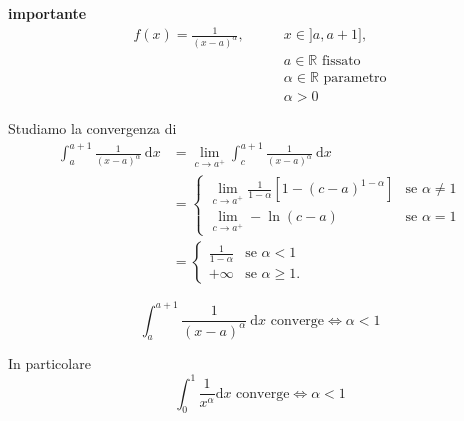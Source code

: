 \begin{exbar}
\begin{example} \textbf{importante}
	\begin{align*}
		f(x)=\frac{1}{(x-a)^\alpha}, \qquad
		& x \in ]a, a+1], 
		\\ & a \in \mathbb{R} \text{ fissato}
		\\ & \alpha \in \mathbb{R} \text{ parametro}
		\\ & \alpha > 0
	\end{align*}
	
	Studiamo la convergenza di 
	\begin{align*}
		\int_{a}^{a+1} \frac{1}{(x-a)^\alpha} \ \mathrm{d}x  
		&= \lim_{c \rightarrow a^+} \int_{c}^{a+1} \frac{1}{(x-a)^\alpha} \ \mathrm{d}x
		\\
		&=
		\begin{cases}
			\lim_{c \rightarrow a^+} \frac{1}{1-\alpha} \left[1 - (c-a)^{1-\alpha} \right] & \text{se } \alpha \neq 1 
			\\[1em]
			\lim_{c \rightarrow a^+} -\ln(c-a) & \text{se } \alpha =1
		\end{cases}\\
		&=
		\begin{cases}
			\frac{1}{1-\alpha} & \text{se } \alpha <1 
			\\[1em]
			+\infty & \text{se } \alpha \geq1.
		\end{cases}
	\end{align*}
\end{example}
\end{exbar}

\begin{attbar}
	\begin{equation*}
		\int_{a}^{a+1} \frac{1}{(x-a)^\alpha} \ \mathrm{d}x \text{ converge} \iff \alpha < 1
	\end{equation*}
	
	In particolare
	\begin{equation*}
		\int_{0}^{1} \frac{1}{x^\alpha} \mathrm{d}x \text{ converge} \iff \alpha < 1
	\end{equation*}
\end{attbar}

